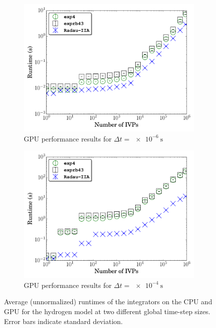 \documentclass[preprint,review,11pt]{elsarticle}
\begin{document}
\begin{figure}[htbp]
\begin{subfigure}{0.49\textwidth}
      \includegraphics[width=\linewidth]{H2_1e-06_gpu_nonorm.pdf}
      \caption{GPU performance results for $\Delta t = \SI{e-6}{\second}$}
  \end{subfigure}
  \begin{subfigure}{0.49\textwidth}
      \includegraphics[width=\linewidth]{H2_1e-04_gpu_nonorm.pdf}
      \caption{GPU performance results for $\Delta t = \SI{e-4}{\second}$}
  \end{subfigure}
  \caption{Average (unnormalized) runtimes of the integrators on the CPU and GPU for the hydrogen model at two different global time-step sizes.
  Error bars indicate standard deviation.}
  \label{F:raw_perf_H2CO}
\end{figure}
\end{document}
